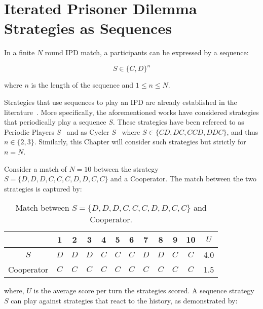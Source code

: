 \section{Iterated Prisoner Dilemma Strategies as Sequences}\label{section:ipd_as_sequences}

In a finite \(N\) round IPD match, a participants can be expressed by a sequence:

\begin{equation}
    S \in \{C, D\} ^ n
\end{equation}

where \(n\) is the length of the sequence and \(1 \leq n \leq N\).

Strategies that use sequences to play an IPD are already established in the
literature~\cite{Beaufils1997, Knight2016, Li2011, Mittal2009}. More
specifically, the aforementioned works have considered strategies that
periodically play a sequence \(S\). These strategies have been refereed to as
Periodic Players \(S\)~\cite{Li2011, Mittal2009} and as Cycler
\(S\)~\cite{Knight2016} where \(S \in \{CD, DC, CCD, DDC\}\), and thus \(n \in
\{2, 3\}\). Similarly, this Chapter will consider such strategies but
strictly for \(n = N\).

Consider a match of \(N = 10\) between the strategy\(S = \{D, D, D, C, C, C, D,
D, C, C\}\) and a Cooperator. The match between the two strategies is captured
by:

\begin{table}[htb]
\centering
\begin{tabular}{cccccccccccc}
    & \textbf{1} & \textbf{2} & \textbf{3} & \textbf{4}  & \textbf{5} & \textbf{6} & \textbf{7} & \textbf{8}  & \textbf{9} & \textbf{10} & \(U\) \\ \midrule
    \(S\) & \(D\) & \(D\) & \(D\) & \(C\) & \(C\) & \(C\) & \(D\) & \(D\) & \(C\) & \(C\) & 4.0 \\
    Cooperator & \(C\) & \(C\) & \(C\) & \(C\) & \(C\) & \(C\) & \(C\) & \(C\) & \(C\) & \(C\) & 1.5 \\ \bottomrule
\end{tabular}
\caption{Match between \(S = \{D, D, D, C, C, C, D, D, C, C\}\) and Cooperator.}\label{table:s_vs_cooperator}
\end{table}

where, \(U\) is the average score per turn the strategies scored. A sequence
strategy \(S\) can play against strategies that react to the history, as demonstrated
by:

